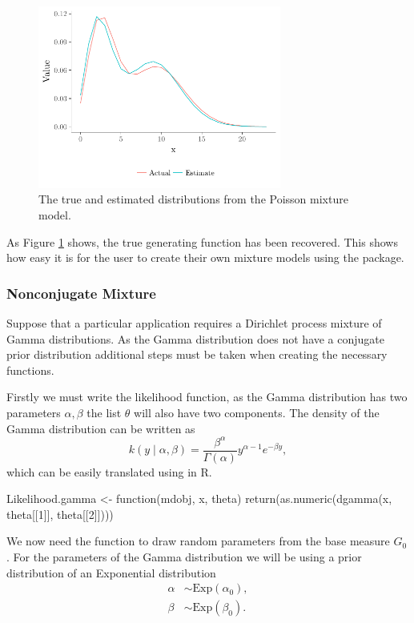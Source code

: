 \documentclass[nojss]{jss}
\begin{document}
\begin{figure}[tb]
\centering
	\includegraphics[height=60mm, width=80mm]{img/poisson_mixture_plot.pdf}
\caption{The true and estimated distributions from the Poisson mixture model.}
\label{fig:poissonmixture}
\end{figure}
As Figure \ref{fig:poissonmixture} shows, the true generating function has been recovered. This shows how easy it is for the user to create their own mixture models using the  package.


\subsubsection{Nonconjugate Mixture}
Suppose that a particular application requires a Dirichlet process mixture of Gamma distributions. As the Gamma distribution does not have a conjugate prior distribution additional steps must be taken when creating the necessary functions.

Firstly we must write the likelihood function, as the Gamma distribution has two parameters $\alpha, \beta$ the list $\theta$ will also have two components. The density of the Gamma distribution can be written as
\begin{equation*}
k(y \mid \alpha, \beta) = \frac{\beta ^ \alpha}{\Gamma (\alpha)} y^{\alpha -1} e ^{- \beta y},
\end{equation*}
which can be easily translated using  in R.
\begin{CodeInput}
Likelihood.gamma <- function(mdobj, x, theta){
  return(as.numeric(dgamma(x, theta[[1]], theta[[2]])))
}
\end{CodeInput}

We now need the function to draw random parameters from the base measure $G_0$. For the parameters of the Gamma distribution we will be using a prior distribution of an Exponential distribution
\begin{align*}
\alpha & \sim \text{Exp} (\alpha _0), \\
\beta & \sim \text{Exp} (\beta _0).
\end{align*}
\end{document}

